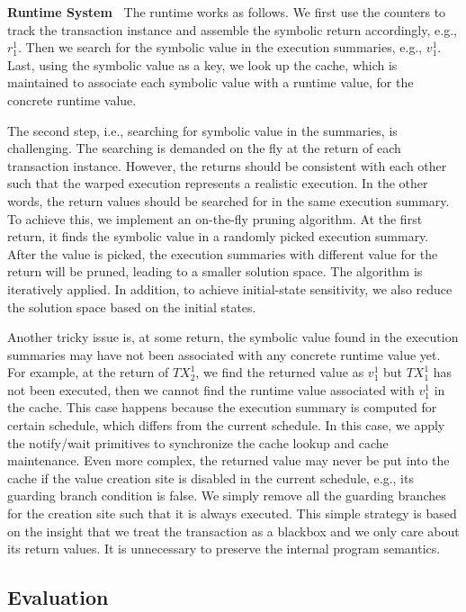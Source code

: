 {\bf Runtime System\ }
The runtime works as follows. We first use the counters to track the transaction instance and assemble the symbolic return accordingly, e.g., $r^1_1$.
Then we search for the symbolic value in the execution summaries, e.g., $v^1_1$. Last, using the symbolic value as a key, we look up the cache, which is maintained to associate each symbolic value with a runtime value, for the concrete runtime value.

The second step, i.e., searching for symbolic value in the summaries, is challenging. The searching is demanded on the fly at the return of each transaction instance. 
However, the returns should be consistent with each other such that the warped execution represents a realistic execution. In the other words, the return values should be searched for in the same execution summary. To achieve this, we implement an on-the-fly pruning algorithm. At the first return, it finds the symbolic value in a randomly picked execution summary. After the value is picked, the execution summaries with different value for the return will be pruned, leading to a smaller solution space. 
The algorithm is iteratively applied. In addition, to achieve initial-state sensitivity, we also reduce the solution space based on the initial states. 

Another tricky issue is, at some return, the symbolic value found in the execution summaries may have not been associated with any concrete runtime value yet.
For example, at the return of $TX^1_2$, we find the returned value as $v^1_1$ but $TX^1_1$ has not been executed, then we cannot find the runtime value associated with $v^1_1$ in the cache. This case happens because the execution summary is computed for certain schedule, which differs from the current schedule. In this case, we apply the notify/wait primitives to synchronize the cache lookup and cache maintenance. Even more complex, the returned value may never be put into the cache if the value creation site is disabled in the current schedule, e.g., its guarding branch condition is false. We simply remove all the guarding branches for the creation site such that it is always executed. This simple strategy is based on the insight that we treat the transaction as a blackbox and we only care about its return values. It is unnecessary to preserve the internal program semantics.


\subsection{Evaluation}
